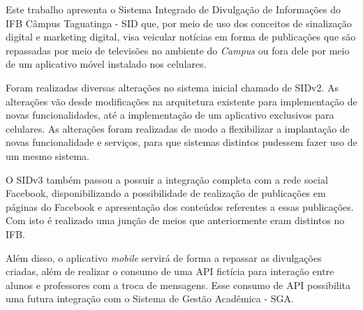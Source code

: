 \begin{resumo}
Este trabalho apresenta o Sistema Integrado de Divulgação de Informações do IFB Câmpus Taguatinga - SID que, por meio de uso dos conceitos de sinalização digital e marketing digital, visa veicular notícias em forma de publicações que são repassadas por meio de televisões no ambiente do \textit{Campus} ou fora dele por meio de um aplicativo móvel instalado nos celulares. 

Foram realizadas diversas alterações no sistema inicial chamado de SIDv2. As alterações vão desde modificações na arquitetura existente para implementação de novas funcionalidades, até a implementação de um aplicativo exclusivos para celulares. As alterações foram realizadas de modo a flexibilizar a implantação de novas funcionalidade e serviços, para que sistemas distintos pudessem fazer uso de um mesmo sistema. 

O SIDv3 também passou a possuir a integração completa com a rede social Facebook, disponibilizando a possibilidade de realização de publicações em páginas do Facebook e apresentação dos conteúdos referentes a essas publicações. Com isto é realizado uma junção de meios que anteriormente eram distintos no IFB.

Além disso, o aplicativo \textit{mobile} servirá de forma a repassar as divulgações criadas, além de realizar o consumo de uma API fictícia para interação entre alunos e professores com a troca de mensagens. Esse consumo de API possibilita uma futura integração com o Sistema de Gestão Acadêmica - SGA.
    
 \noindent
\end{resumo}
